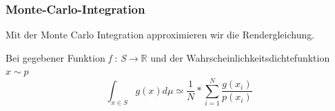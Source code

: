 \subsubsection{Monte-Carlo-Integration}
Mit der Monte Carlo Integration approximieren wir die Rendergleichung.\par 
Bei gegebener Funktion \textit{f }:\textit{ S}$\rightarrow \mathbb{R}$ und der 
Wahrscheinlichkeitsdichtefunktion $x \sim p$
\cite{KK02}
\label{pic:MonteCarloIntegration}
\begin{equation}\label{eq:montcarlo}
    \int_{x\in S} g(x) d\mu \simeq \frac{1}{N}*\sum_{i=1}^{N}\frac{g(x_i)}{p(x_i)}
\end{equation}
    


